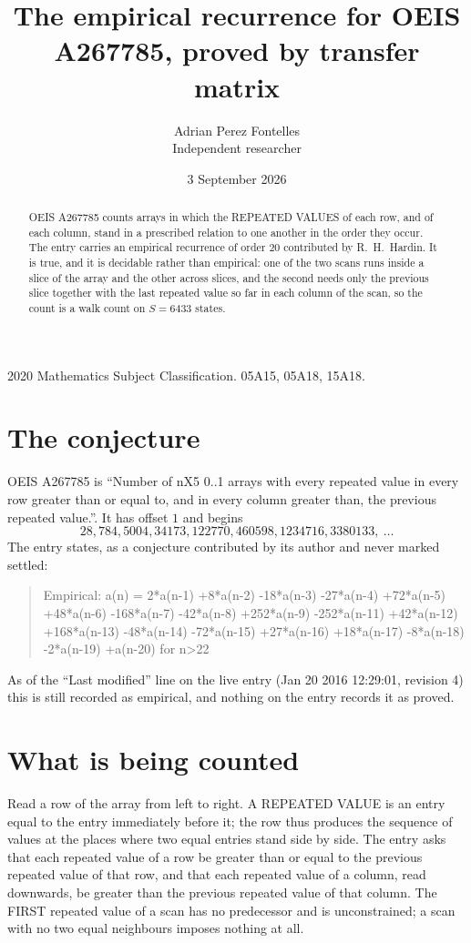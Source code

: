 \documentclass[11pt,a4paper]{article}
\title{The empirical recurrence for OEIS A267785, proved by transfer matrix}
\author{Adrian Perez Fontelles\\ \small Independent researcher}
\date{3 September 2026}
\theoremstyle{plain}
\theoremstyle{definition}
\begin{document}
\maketitle

\begin{abstract}
OEIS A267785 counts arrays in which the REPEATED VALUES of each row, and of each column, stand in a
prescribed relation to one another in the order they occur. The entry carries an empirical
recurrence of order $20$ contributed by R.~H.~Hardin. It is true, and it is decidable
rather than empirical: one of the two scans runs inside a slice of the array and the other
across slices, and the second needs only the previous slice together with the last repeated
value so far in each column of the scan, so the count is a walk count on $S=6433$ states.
\end{abstract}

\noindent\small 2020 Mathematics Subject Classification. 05A15, 05A18, 15A18.\normalsize

\section{The conjecture}

OEIS A267785 is ``Number of nX5 0..1 arrays with every repeated value in every row greater than or equal to, and in every column greater than, the previous repeated value.''. It has offset $1$ and begins
\[
28, 784, 5004, 34173, 122770, 460598, 1234716, 3380133,\ \dots
\]
The entry states, as a conjecture contributed by its author and never marked settled:
\begin{quote}
Empirical: a(n) = 2*a(n-1) +8*a(n-2) -18*a(n-3) -27*a(n-4) +72*a(n-5) +48*a(n-6) -168*a(n-7) -42*a(n-8) +252*a(n-9) -252*a(n-11) +42*a(n-12) +168*a(n-13) -48*a(n-14) -72*a(n-15) +27*a(n-16) +18*a(n-17) -8*a(n-18) -2*a(n-19) +a(n-20) for n>22
\end{quote}
As of the ``Last modified'' line on the live entry (Jan 20 2016 12:29:01, revision 4) this is still
recorded as empirical, and nothing on the entry records it as proved.

\section{What is being counted}

Read a row of the array from left to right. A REPEATED VALUE is an entry equal to the entry
immediately before it; the row thus produces the sequence of values at the places where two
equal entries stand side by side. The entry asks that each repeated value of a row be
greater than or equal to the previous repeated value of that row, and that each repeated value of a column,
read downwards, be greater than the previous repeated value of that column. The FIRST repeated
value of a scan has no predecessor and is unconstrained; a scan with no two equal neighbours
imposes nothing at all.
\end{document}
